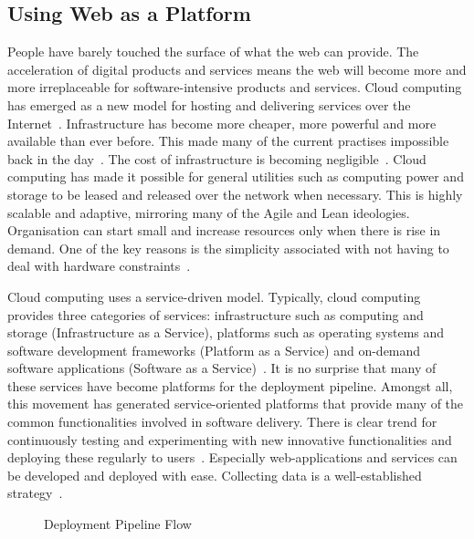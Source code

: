 \documentclass[english]{tktltiki2}
\begin{document}
\subsection{Using Web as a Platform}

People have barely touched the surface of what the web can provide. The acceleration of digital products and services means the web will become more and more irreplaceable for software-intensive products and services. Cloud computing has emerged as a new model for hosting and delivering services over the Internet~\cite{ZCB10}. Infrastructure has become more cheaper, more powerful and more available than ever before. This made many of the current practises impossible back in the day~\cite{Roy70}. The cost of infrastructure is becoming negligible~\cite{ZCB10, Bos12}. Cloud computing has made it possible for general utilities such as computing power and storage to be leased and released over the network when necessary. This is highly scalable and adaptive, mirroring many of the Agile and Lean ideologies. Organisation can start small and increase resources only when there is rise in demand. One of the key reasons is the simplicity associated with not having to deal with hardware constraints~\cite{BE12}.

Cloud computing uses a service-driven model. Typically, cloud computing provides three categories of services: infrastructure such as computing and storage (Infrastructure as a Service), platforms such as operating systems and software development frameworks (Platform as a Service) and on-demand software applications (Software as a Service)~\cite{ZCB10}. It is no surprise that many of these services have become platforms for the deployment pipeline. Amongst all, this movement has generated service-oriented platforms that provide many of the common functionalities involved in software delivery. There is clear trend for continuously testing and experimenting with new innovative functionalities and deploying these regularly to users~\cite{BE12}. Especially web-applications and services can be developed and deployed with ease. Collecting data is a well-established strategy~\cite{HB14}.

\begin{figure}[h!]

    \vspace{1cm}
    \centering


    \caption{Deployment Pipeline Flow}
    \label{figure:deployment-pipeline-flow}

    \vspace{1cm}

\end{figure}
\end{document}
